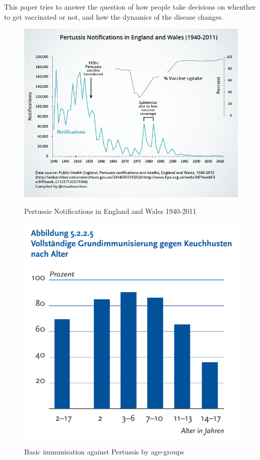 \documentclass[11pt]{article}
\begin{document}
This paper tries to answer the question of how people take decisions on whenther to get vaccinated or not, and how the dynamics of the disease changes. 

\begin{figure}
\centering
\begin{minipage}{.6\textwidth}
  \centering
  \includegraphics[height=0.7\linewidth]{ukpertussis}
  \caption{Pertussis Notifications in England \break
  and Wales 1940-2011}  
  \label{fig:test1}
  
\end{minipage}%
\begin{minipage}{.4\textwidth}
  \centering
  \includegraphics[height=1\linewidth]{grundimmodeutschlandpertussis}
  \caption{Basic immunisation against Pertussis by age-groups}
  \label{fig:test2}
 
\end{minipage}%
\end{figure}
\end{document}
